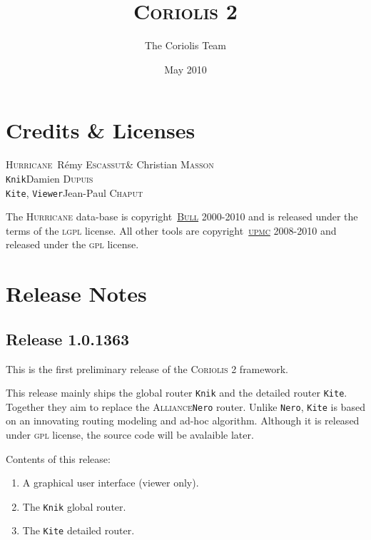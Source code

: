 \documentclass[11pt]{article}
\newcommand{\xhref}        [2]{\href{#2}{#1}}
\newcommand{\xhref}        [2]{\htmladdnormallink{#1}{#2}}
\newcommand {\Chaput}             {\textsc{Chaput}\xspace}
\newcommand {\Dupuis}             {\textsc{Dupuis}\xspace}
\newcommand {\Escassut}           {\textsc{Escassut}\xspace}
\newcommand {\Masson}             {\textsc{Masson}\xspace}
\newcommand {\LGPL}               {\textsc{lgpl}\xspace}
\newcommand {\GPL}                {\textsc{gpl}\xspace}
\newcommand {\Bull}               {\xhref{\textsc{Bull}}{http://www.bull.com/}\xspace}
\newcommand {\UPMC}               {\xhref{\textsc{upmc}}{http://www.upmc.fr/}\xspace}
\newcommand {\Alliance}           {\textsc{Alliance}\xspace}
\newcommand {\Nero}               {\texttt{Nero}\xspace}
\newcommand {\CoriolisII}         {\textsc{Coriolis 2}\xspace}
\newcommand {\Hurricane}          {\textsc{Hurricane}\xspace}
\newcommand {\Knik}               {\texttt{Knik}\xspace}
\newcommand {\Kite}               {\texttt{Kite}\xspace}
\newcommand {\Viewer}             {\texttt{Viewer}\xspace}
\begin{document}
 \title{\CoriolisII}
 \author{The Coriolis Team}
 \date{May 2010}

 \maketitle

 \thispagestyle{fancy}

 \tableofcontents

 \section{Credits \& Licenses}

 \begin{center}
   \Hurricane     \dotfill\      Rémy \Escassut \& Christian \Masson   \\
   \Knik          \dotfill     Damien \Dupuis   \\
   \Kite, \Viewer \dotfill  Jean-Paul \Chaput   \\
 \end{center}

 The \Hurricane data-base is copyright\textcopyright\ \Bull 2000-2010 and is
 released under the terms of the \LGPL license. All other tools are
 copyright\textcopyright\ \UPMC 2008-2010 and released under the \GPL
 license. 

 \newpage


 \section{Release Notes}

 \subsection{Release 1.0.1363}

 This is the first preliminary release of the \CoriolisII framework.

 This release mainly ships the global router \Knik and the detailed router
 \Kite. Together they aim to replace the \Alliance \Nero router.
 Unlike \Nero, \Kite is based on an innovating routing modeling and ad-hoc
 algorithm. Although it is released under \GPL license, the source code
 will be avalaible later.
 \medskip

 \noindent Contents of this release:
 \begin{enumerate}
   \item A graphical user interface (viewer only).
   \item The \Knik global router.
   \item The \Kite detailed router.
 \end{enumerate}
\end{document}

